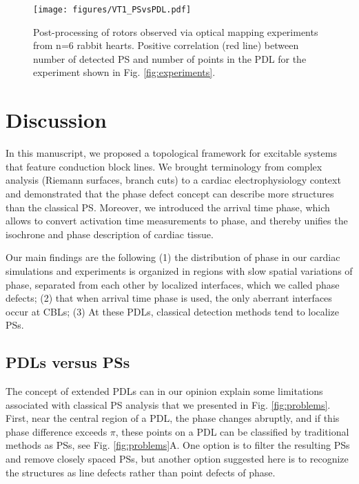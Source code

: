 \documentclass{article}
\begin{document}
\begin{figure}[htp]
\centering
\texttt{[image: figures/VT1\_PSvsPDL.pdf]}
\caption{Post-processing of rotors observed via optical mapping experiments from n=6 rabbit hearts. %
Positive correlation (red line) between number of detected PS and number of points in the PDL for the experiment shown in Fig. \ref{fig:experiments}. \label{fig:post}
}
\end{figure}

\section{Discussion}\label{sec:discussion}

In this manuscript, we proposed a topological framework for excitable systems that feature conduction block lines. We brought terminology from complex analysis (Riemann surfaces, branch cuts) to a cardiac electrophysiology context and demonstrated that the phase defect concept can describe more structures than the classical PS. Moreover, we introduced the arrival time phase, which allows to convert activation time measurements to phase, and thereby unifies the isochrone and phase description of cardiac tissue. 

Our main findings are the following (1) the distribution of phase in our cardiac simulations and experiments is organized in regions with slow spatial variations of phase, separated from each other by localized interfaces, which we called phase defects; (2) that when arrival time phase is used, the only aberrant interfaces occur at CBLs; (3) At these PDLs, classical detection methods tend to localize PSs. 

\subsection{PDLs versus PSs}

The concept of extended PDLs can in our opinion explain some limitations associated with classical PS analysis that we presented in Fig. \ref{fig:problems}. First, near the central region of a PDL, the phase changes abruptly, and if this phase difference exceeds $\pi$, these points on a PDL can be classified by traditional methods as PSs, see Fig. \ref{fig:problems}A. One option is to filter the resulting PSs and remove closely spaced PSs, but another option suggested here is to recognize the structures as line defects rather than point defects of phase.  
\end{document}
